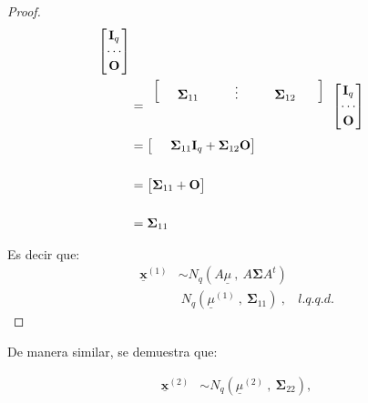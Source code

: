 \documentclass[
]{book}
\theoremstyle{definition}
\theoremstyle{definition}
\theoremstyle{definition}
\theoremstyle{definition}
\theoremstyle{remark}
\begin{document}
\begin{proof}
\begin{align*}
\begin{array}{c}
\end{array}  
 \begin{bmatrix}
\mathbf{I}_q \\ \cdots \\ \mathbf{O}  
 \end{bmatrix} \\ 
&=\begin{array}{c}
\begin{bmatrix}
\hspace{0.5cm}  \mathbf{\Sigma}_{11} \hspace{1.0cm} \vdots  \hspace{1.0cm}  \mathbf{\Sigma}_{12}\ \hspace{0.5cm}
 \end{bmatrix}\\
 \\ \\
\end{array}  
 \begin{bmatrix}
\mathbf{I}_q \\ \cdots \\ \mathbf{O}  
 \end{bmatrix} \\ 
&=\begin{bmatrix}
\hspace{0.5cm}  \mathbf{\Sigma}_{11} \mathbf{I}_q+ \mathbf{\Sigma}_{12}\mathbf{O}   
\end{bmatrix}\\ \\ 
 &=\begin{bmatrix}
\mathbf{\Sigma}_{11} + \mathbf{O}   
\end{bmatrix}\\ \\ 
& = \mathbf{\Sigma}_{11}
\end{align*}

Es decir que:
\begin{align*}
\underline{\mathbf{x}}^{(1)} & \sim N_q\left(A\underline{\mu}\ , \ A\mathbf{\Sigma} A^t\right)\\
&~  N_q\left(\underline{\mu}^{(1)}\ , \ \mathbf{\Sigma}_{11}\right)\ , \ \ \ \ l.q.q.d.
\end{align*}
\end{proof}

De manera similar, se demuestra que:

\begin{align*}
\underline{\mathbf{x}}^{(2)} & \sim N_q\left(\underline{\mu}^{(2)}\ , \ \mathbf{\Sigma}_{22}\right),
\end{align*}
\end{document}
